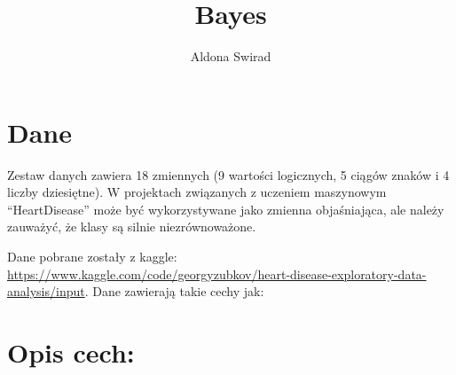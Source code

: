 \documentclass[
]{article}
\title{Bayes}
\author{Aldona Swirad}
\date{}
\begin{document}
\maketitle

\section{Dane}\label{dane}

Zestaw danych zawiera 18 zmiennych (9 wartości logicznych, 5 ciągów
znaków i 4 liczby dziesiętne). W projektach związanych z uczeniem
maszynowym ``HeartDisease'' może być wykorzystywane jako zmienna
objaśniająca, ale należy zauważyć, że klasy są silnie niezrównoważone.

Dane pobrane zostały z kaggle:
\url{https://www.kaggle.com/code/georgyzubkov/heart-disease-exploratory-data-analysis/input}.
Dane zawierają takie cechy jak:

\section{Opis cech:}\label{opis-cech}
\end{document}
